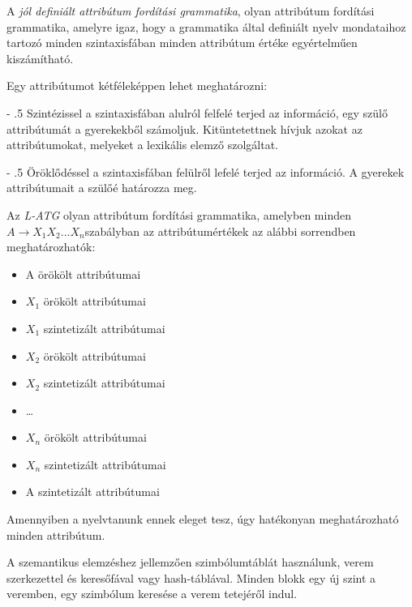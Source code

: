 \documentclass[margin=0px]{article}
\makeatletter
\renewcommand\paragraph{%
    \@startsection{paragraph}{4}{0mm}%
    {-\baselineskip}%
    {.5\baselineskip}%
    {\normalfont\normalsize\bfseries}}
\makeatother
\begin{document}
A \textit{jól definiált attribútum fordítási grammatika}, olyan attribútum fordítási grammatika, amelyre igaz, hogy a	grammatika által definiált nyelv mondataihoz tartozó minden szintaxisfában minden attribútum értéke egyértelműen kiszámítható.

Egy attribútumot kétféleképpen lehet meghatározni:

\paragraph{Szintézissel} a szintaxisfában alulról felfelé terjed az információ, egy szülő attribútumát a gyerekekből számoljuk. Kitüntetettnek hívjuk azokat az attribútumokat, melyeket a lexikális elemző szolgáltat.

\paragraph{Öröklődéssel} a szintaxisfában felülről lefelé terjed az információ. A gyerekek attribútumait a szülőé határozza meg.

Az \textit{L-ATG} olyan attribútum fordítási grammatika, amelyben minden
$ A	\rightarrow	X_1X_2 . . .	X_n  $szabályban az attribútumértékek az alábbi sorrendben meghatározhatók:

\begin{itemize}
    \item
          A örökölt attribútumai
    \item
          $ X_1 $ örökölt attribútumai
    \item
          $ X_1 $ szintetizált attribútumai
    \item
          $ X_2 $ örökölt attribútumai
    \item
          $ X_2 $ szintetizált attribútumai
    \item
          \dots
    \item
          $ X_n $ örökölt attribútumai
    \item
          $ X_n $ szintetizált attribútumai
    \item
          A szintetizált attribútumai
\end{itemize}

Amennyiben a nyelvtanunk ennek eleget tesz, úgy hatékonyan meghatározható minden attribútum.

A szemantikus elemzéshez jellemzően szimbólumtáblát használunk, verem szerkezettel és keresőfával vagy hash-táblával. Minden blokk egy új szint a veremben, egy szimbólum keresése a verem tetejéről indul.
\end{document}
